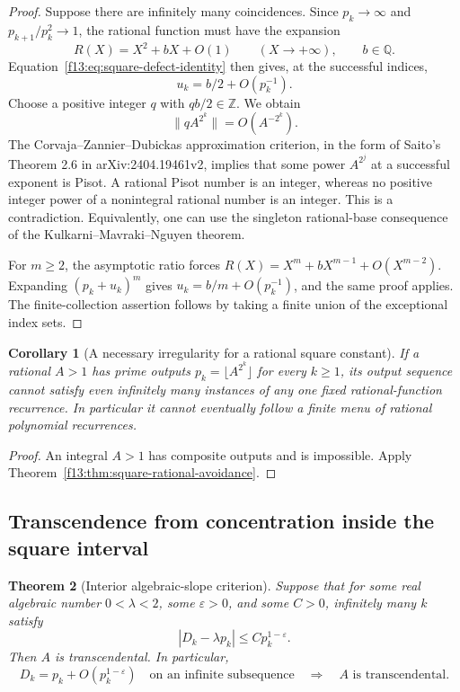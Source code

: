 \documentclass[11pt,a4paper]{article}
\newtheorem{theorem}{Theorem}[section]
\newtheorem{corollary}[theorem]{Corollary}
\theoremstyle{definition}
\theoremstyle{remark}
\numberwithin{equation}{section}
\begin{document}
\begin{proof}
Suppose there are infinitely many coincidences.  Since $p_k\to\infty$
and $p_{k+1}/p_k^2\to1$, the rational function must have the expansion
\[
 R(X)=X^2+bX+O(1)\qquad(X\to+\infty),\qquad b\in\mathbb Q.
\]
Equation~\eqref{f13:eq:square-defect-identity} then gives, at the successful
indices,
\[
 u_k=b/2+O(p_k^{-1}).
\]
Choose a positive integer $q$ with $qb/2\in\mathbb Z$.  We obtain
\begin{equation}\label{f13:eq:square-rational-nearest}
 \|qA^{2^k}\|=O(A^{-2^k}).
\end{equation}
The Corvaja--Zannier--Dubickas approximation criterion, in the form
of Saito's Theorem 2.6 in arXiv:2404.19461v2, implies that some power
$A^{2^j}$ at a successful exponent is Pisot.  A rational Pisot number
is an integer, whereas no positive integer power of a nonintegral
rational number is an integer.  This is a contradiction.  Equivalently,
one can use the singleton rational-base consequence of the
Kulkarni--Mavraki--Nguyen theorem.

For $m\ge2$, the asymptotic ratio forces
$R(X)=X^m+bX^{m-1}+O(X^{m-2})$.  Expanding
$(p_k+u_k)^m$ gives $u_k=b/m+O(p_k^{-1})$, and the same proof applies.
The finite-collection assertion follows by taking a finite union of
the exceptional index sets.
\end{proof}

\begin{corollary}[A necessary irregularity for a rational square constant]
If a rational $A>1$ has prime outputs $p_k=\lfloor A^{2^k}\rfloor$
for every $k\ge1$, its output sequence cannot satisfy even infinitely
many instances of any one fixed rational-function recurrence.
In particular it cannot eventually follow a finite menu of rational
polynomial recurrences.
\end{corollary}

\begin{proof}
An integral $A>1$ has composite outputs and is impossible.  Apply
Theorem~\ref{f13:thm:square-rational-avoidance}.
\end{proof}

\subsection{Transcendence from concentration inside the square interval}

\begin{theorem}[Interior algebraic-slope criterion]
\label{f13:thm:square-interior-slope}
Suppose that for some real algebraic number $0<\lambda<2$, some
$\varepsilon>0$, and some $C>0$, infinitely many $k$ satisfy
\begin{equation}\label{f13:eq:square-interior-condition}
 |D_k-\lambda p_k|\le C p_k^{1-\varepsilon}.
\end{equation}
Then $A$ is transcendental.  In particular,
\[
 D_k=p_k+O(p_k^{1-\varepsilon})
 \quad\text{on an infinite subsequence}
 \quad\Longrightarrow\quad A\text{ is transcendental}.
\]
\end{theorem}
\end{document}
